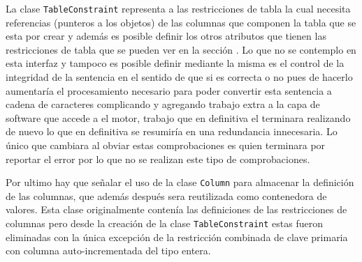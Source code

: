 La clase \verb=TableConstraint= representa a las restricciones de tabla la cual necesita referencias (punteros a los objetos) de las columnas que componen la tabla que se esta por crear y además es posible definir los otros atributos que tienen las restricciones de tabla que se pueden ver en la sección  . Lo que no se contemplo en esta interfaz y tampoco es posible definir mediante la misma es el control de la integridad de la sentencia en el sentido de que si es correcta o no pues de hacerlo aumentaría el procesamiento necesario para poder convertir esta sentencia a cadena de caracteres complicando y agregando trabajo extra a la capa de software que accede a el motor, trabajo que en definitiva el terminara realizando de nuevo lo que en definitiva se resumiría en una redundancia innecesaria. Lo único que cambiara al obviar estas comprobaciones es quien terminara por reportar el error por lo que no se realizan este tipo de comprobaciones.

Por ultimo hay que señalar el uso de la clase \verb=Column= para almacenar la definición de las columnas, que además después sera reutilizada como contenedora de valores. Esta clase originalmente contenía las definiciones de las restricciones de columnas pero desde la creación de la clase \verb=TableConstraint= estas fueron eliminadas con la única excepción de la restricción combinada de clave primaria con columna  auto-incrementada del tipo entera.
%
